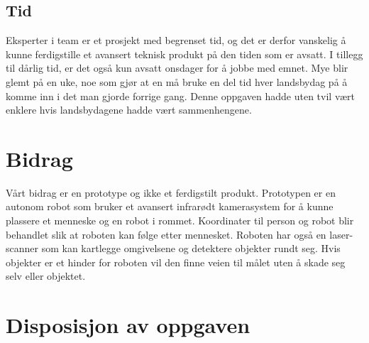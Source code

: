 \subsection{Tid}
Eksperter i team er et prosjekt med begrenset tid, og det er derfor vanskelig å kunne ferdigstille et avansert teknisk produkt på den tiden som er avsatt. I tillegg til dårlig tid, er det også kun avsatt onsdager for å jobbe med emnet. Mye blir glemt på en uke, noe som gjør at en må bruke en del tid hver landsbydag på å komme inn i det man gjorde forrige gang. Denne oppgaven hadde uten tvil vært enklere hvis landsbydagene hadde vært sammenhengene. 


\section{Bidrag}
Vårt bidrag er en prototype og ikke et ferdigstilt produkt. Prototypen er en autonom robot som bruker et avansert infrarødt kamerasystem for å kunne plassere et menneske og en robot i rommet. Koordinater til person og robot blir behandlet slik at roboten kan følge etter mennesket. Roboten har også en laser-scanner som kan kartlegge omgivelsene og detektere objekter rundt seg. Hvis objekter er et hinder for roboten vil den finne veien til målet uten å skade seg selv eller objektet. 

\section{Disposisjon av oppgaven}


